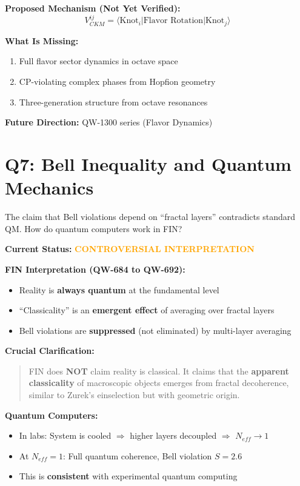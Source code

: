 \documentclass[11pt, a4paper]{article}
\theoremstyle{remark}
\begin{document}
\textbf{Proposed Mechanism (Not Yet Verified):}
\begin{equation}
V_{CKM}^{ij} = \langle \text{Knot}_i | \text{Flavor Rotation} | \text{Knot}_j \rangle
\end{equation}

\textbf{What Is Missing:}
\begin{enumerate}
    \item Full flavor sector dynamics in octave space
    \item CP-violating complex phases from Hopfion geometry
    \item Three-generation structure from octave resonances
\end{enumerate}

\textbf{Future Direction:} QW-1300 series (Flavor Dynamics)

\hrulefill

\section{Q7: Bell Inequality and Quantum Mechanics}

\begin{question}
The claim that Bell violations depend on ``fractal layers'' contradicts standard QM. How do quantum computers work in FIN?
\end{question}

\textbf{Current Status:} \textcolor{orange}{\textbf{CONTROVERSIAL INTERPRETATION}}

\textbf{FIN Interpretation (QW-684 to QW-692):}
\begin{itemize}
    \item Reality is \textbf{always quantum} at the fundamental level
    \item ``Classicality'' is an \textbf{emergent effect} of averaging over fractal layers
    \item Bell violations are \textbf{suppressed} (not eliminated) by multi-layer averaging
\end{itemize}

\textbf{Crucial Clarification:}
\begin{quote}
FIN does \textbf{NOT} claim reality is classical. It claims that the \textbf{apparent classicality} of macroscopic objects emerges from fractal decoherence, similar to Zurek's einselection but with geometric origin.
\end{quote}

\textbf{Quantum Computers:}
\begin{itemize}
    \item In labs: System is cooled $\Rightarrow$ higher layers decoupled $\Rightarrow$ $N_{eff} \to 1$
    \item At $N_{eff} = 1$: Full quantum coherence, Bell violation $S = 2.6$
    \item This is \textbf{consistent} with experimental quantum computing
\end{itemize}
\end{document}
